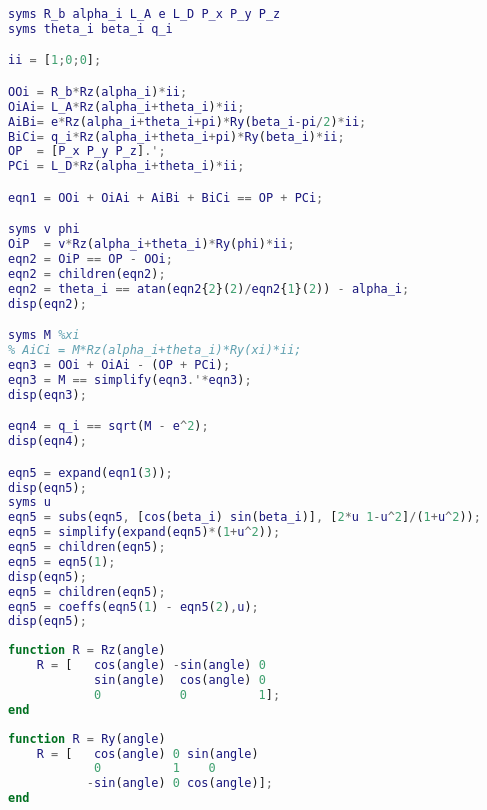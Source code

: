 \begin{lstlisting}[frame=single,language = matlab]
syms R_b alpha_i L_A e L_D P_x P_y P_z
syms theta_i beta_i q_i

ii = [1;0;0];

OOi = R_b*Rz(alpha_i)*ii;
OiAi= L_A*Rz(alpha_i+theta_i)*ii;
AiBi= e*Rz(alpha_i+theta_i+pi)*Ry(beta_i-pi/2)*ii;
BiCi= q_i*Rz(alpha_i+theta_i+pi)*Ry(beta_i)*ii;
OP  = [P_x P_y P_z].';
PCi = L_D*Rz(alpha_i+theta_i)*ii;

eqn1 = OOi + OiAi + AiBi + BiCi == OP + PCi;

syms v phi
OiP  = v*Rz(alpha_i+theta_i)*Ry(phi)*ii;
eqn2 = OiP == OP - OOi;
eqn2 = children(eqn2);
eqn2 = theta_i == atan(eqn2{2}(2)/eqn2{1}(2)) - alpha_i;
disp(eqn2);

syms M %xi
% AiCi = M*Rz(alpha_i+theta_i)*Ry(xi)*ii;
eqn3 = OOi + OiAi - (OP + PCi);
eqn3 = M == simplify(eqn3.'*eqn3);
disp(eqn3);

eqn4 = q_i == sqrt(M - e^2);
disp(eqn4);

eqn5 = expand(eqn1(3));
disp(eqn5);
syms u
eqn5 = subs(eqn5, [cos(beta_i) sin(beta_i)], [2*u 1-u^2]/(1+u^2));
eqn5 = simplify(expand(eqn5)*(1+u^2));
eqn5 = children(eqn5);
eqn5 = eqn5(1);
disp(eqn5);
eqn5 = children(eqn5);
eqn5 = coeffs(eqn5(1) - eqn5(2),u);
disp(eqn5);
\end{lstlisting}

\begin{lstlisting}[frame=single,language = matlab]
function R = Rz(angle)
    R = [   cos(angle) -sin(angle) 0
            sin(angle)  cos(angle) 0
            0           0          1];
end
\end{lstlisting}

\begin{lstlisting}[frame=single,language = matlab]
function R = Ry(angle)
    R = [   cos(angle) 0 sin(angle)
            0          1    0
           -sin(angle) 0 cos(angle)];
end
\end{lstlisting}